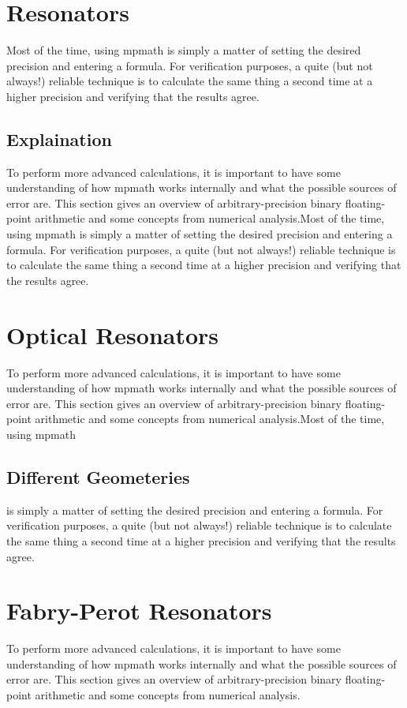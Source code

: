 \section{Resonators}
Most of the time, using mpmath is simply a matter of setting the desired precision and entering a formula. For verification purposes, a quite (but not always!) reliable technique is to calculate the same thing a second time at a higher precision and verifying that the results agree.
\subsection{Explaination}
To perform more advanced calculations, it is important to have some understanding of how mpmath works internally and what the possible sources of error are. This section gives an overview of arbitrary-precision binary floating-point arithmetic and some concepts from numerical analysis.Most of the time, using mpmath is simply a matter of setting the desired precision and entering a formula. For verification purposes, a quite (but not always!) reliable technique is to calculate the same thing a second time at a higher precision and verifying that the results agree.
\section{Optical Resonators}

To perform more advanced calculations, it is important to have some understanding of how mpmath works internally and what the possible sources of error are. This section gives an overview of arbitrary-precision binary floating-point arithmetic and some concepts from numerical analysis.Most of the time, using mpmath 
\subsection{Different Geometeries}

is simply a matter of setting the desired precision and entering a formula. For verification purposes, a quite (but not always!) reliable technique is to calculate the same thing a second time at a higher precision and verifying that the results agree.
\section{Fabry-Perot Resonators}

To perform more advanced calculations, it is important to have some understanding of how mpmath works internally and what the possible sources of error are. This section gives an overview of arbitrary-precision binary floating-point arithmetic and some concepts from numerical analysis.
